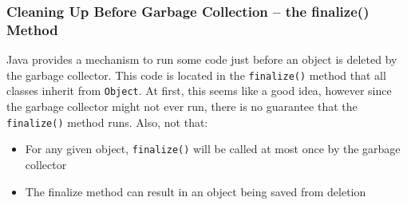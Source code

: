 \subsubsection{Cleaning Up Before Garbage Collection -- the finalize() Method}
Java provides a mechanism to run some code just before an object is deleted by 
the garbage collector. This code is located in the \verb#finalize()# method 
that all classes inherit from \verb#Object#. At first, this seems like a good 
idea, however since the garbage collector might not ever run, there is no 
guarantee that the \verb#finalize()# method runs. Also, not that:
\begin{itemize}
    \item For any given object, \verb#finalize()# will be called at most once 
    by the garbage collector
    \item The finalize method can result in an object being saved from deletion
\end{itemize}
